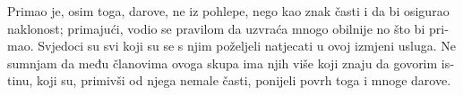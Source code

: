 \documentclass[a5paper,twoside]{article}
\begin{document}
\begin{pages}
\begin{Rightside}
\begin{croatian}
\pend
\pstart
Primao je, osim toga, darove, ne iz pohlepe, nego kao znak časti i da bi osigurao naklonost; primajući, vodio se pravilom da uzvraća mnogo obilnije no što bi primao.  Svjedoci su svi koji su se s njim poželjeli natjecati u ovoj izmjeni usluga.  Ne sumnjam da među članovima ovoga skupa ima njih više koji znaju da govorim istinu, koji su, primivši od njega nemale časti, ponijeli povrh toga i mnoge darove.
\pend

\endnumbering
\end{croatian}
\end{Rightside}

\end{pages}
\Pages
\end{document}
